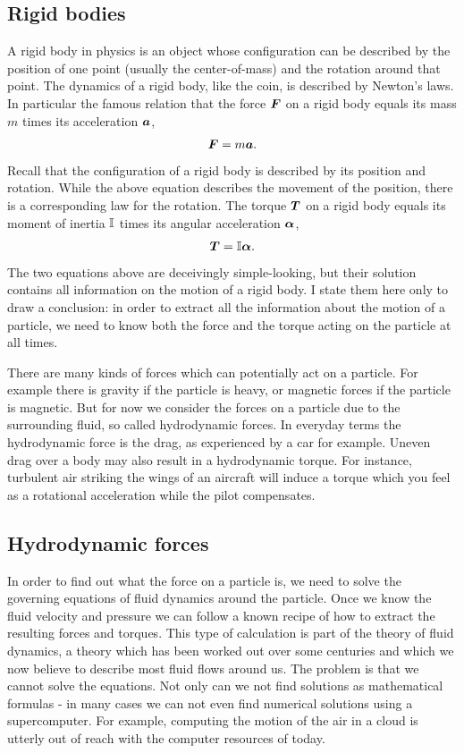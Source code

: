 \documentclass[thesis.tex]{subfiles}
\begin{document}
\subsection{Rigid bodies}

A rigid body in physics is an object whose configuration can be described by the position of one point (usually the center-of-mass) and the rotation around that point. The dynamics of a rigid body, like the coin, is described by Newton's laws. In particular the famous relation that the force $\mbox{\boldmath$F$}$ on a rigid body equals its mass $m$ times its acceleration $\mbox{\boldmath$a$}$,
\begin{align*}
	\mbox{\boldmath$F$} = m\mbox{\boldmath$a$}.
\end{align*}
Recall that the configuration of a rigid body is described by its position and rotation. While the above equation describes the movement of the position, there is a corresponding law for the rotation. The torque $\mbox{\boldmath$T$}$ on a rigid body equals its moment of inertia $\mathbb{I}$ times its angular acceleration $\mbox{\boldmath$\alpha$}$,
\begin{align*}
	\mbox{\boldmath$T$} = \mathbb{I} \mbox{\boldmath$\alpha$}.
\end{align*}
The two equations above are deceivingly simple-looking, but their solution contains all information on the motion of a rigid body. I state them here only to draw a conclusion: in order to extract all the information about the motion of a particle, we need to know both the force and the torque acting on the particle at all times.

There are many kinds of forces which can potentially act on a particle. For example there is gravity if the particle is heavy, or magnetic forces if the particle is magnetic. But for now we consider the forces on a particle due to the surrounding fluid, so called hydrodynamic forces. In everyday terms the hydrodynamic force is the drag, as experienced by a car for example. Uneven drag over a body may also result in a hydrodynamic torque. For instance, turbulent air striking the wings of an aircraft will induce a torque which you feel as a rotational acceleration while the pilot compensates.

\subsection{Hydrodynamic forces}

In order to find out what the force on a particle is, we need to solve the governing equations of fluid dynamics around the particle. Once we know the fluid velocity and pressure we can follow a known recipe of how to extract the resulting forces and torques. This type of calculation is part of the theory of fluid dynamics, a theory which has been worked out over some centuries and which we now believe to describe most fluid flows around us. The problem is that we cannot solve the equations. Not only can we not find solutions as mathematical formulas - in many cases we can not even find numerical solutions using a supercomputer. For example, computing the motion of the air in a cloud is utterly out of reach with the computer resources of today.
\end{document}
